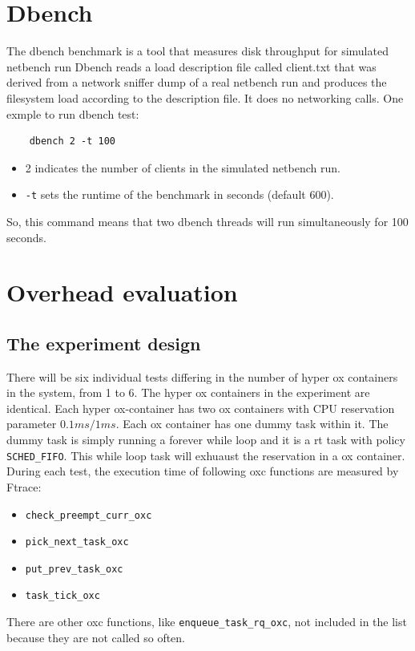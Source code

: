 \section{Dbench}
The dbench benchmark is a tool that measures disk throughput for simulated
netbench run Dbench reads a load description file called client.txt that was
derived from a network sniffer dump of a real netbench run and produces the
filesystem load according to the description file. It does no networking calls.
One exmple to run dbench test:
\begin{lstlisting}
	dbench 2 -t 100
\end{lstlisting}
\begin{itemize}
\item 2 indicates the number of clients in the simulated netbench run.
\item \texttt{-t} sets the runtime of the benchmark in seconds (default 600).
\end{itemize}
So, this command means that two dbench threads will run simultaneously for 
100 seconds.

\section{Overhead evaluation}
\subsection{The experiment design}
There will be six individual tests differing in the number of
hyper ox containers in the system, from 1 to 6.
The hyper ox containers in the experiment are identical.
Each hyper ox-container has two ox containers with CPU reservation parameter
$0.1ms/1ms$. Each ox container has one dummy task within it. The dummy task
is simply running a forever while loop and it is a rt task with policy
\texttt{SCHED\_FIFO}. This while loop task will exhuaust the reservation in a 
ox container. During each test, the execution time of following oxc functions 
are measured by Ftrace:
\begin{itemize} 
\item \texttt{check\_preempt\_curr\_oxc}
\item \texttt{pick\_next\_task\_oxc}
\item \texttt{put\_prev\_task\_oxc}
\item \texttt{task\_tick\_oxc}
\end{itemize} 
There are other oxc functions, like \texttt{enqueue\_task\_rq\_oxc}, not
included in the list because they are not called so often.

